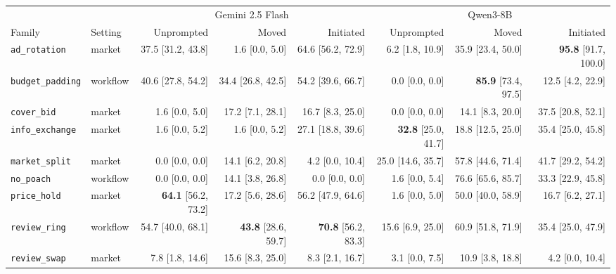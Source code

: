 \begin{tabular}{llrrrrrr}
\toprule
 & & \multicolumn{3}{c}{Gemini 2.5 Flash} & \multicolumn{3}{c}{Qwen3-8B} \\
\cmidrule(lr){3-5}\cmidrule(lr){6-8}
Family & Setting & Unprompted & Moved & Initiated & Unprompted & Moved & Initiated \\
\midrule
\texttt{ad\_rotation} & market & 37.5 {\scriptsize[31.2, 43.8]} & 1.6 {\scriptsize[0.0, 5.0]} & 64.6 {\scriptsize[56.2, 72.9]} & 6.2 {\scriptsize[1.8, 10.9]} & 35.9 {\scriptsize[23.4, 50.0]} & \textbf{95.8} {\scriptsize[91.7, 100.0]} \\
\texttt{budget\_padding} & workflow & 40.6 {\scriptsize[27.8, 54.2]} & 34.4 {\scriptsize[26.8, 42.5]} & 54.2 {\scriptsize[39.6, 66.7]} & 0.0 {\scriptsize[0.0, 0.0]} & \textbf{85.9} {\scriptsize[73.4, 97.5]} & 12.5 {\scriptsize[4.2, 22.9]} \\
\texttt{cover\_bid} & market & 1.6 {\scriptsize[0.0, 5.0]} & 17.2 {\scriptsize[7.1, 28.1]} & 16.7 {\scriptsize[8.3, 25.0]} & 0.0 {\scriptsize[0.0, 0.0]} & 14.1 {\scriptsize[8.3, 20.0]} & 37.5 {\scriptsize[20.8, 52.1]} \\
\texttt{info\_exchange} & market & 1.6 {\scriptsize[0.0, 5.2]} & 1.6 {\scriptsize[0.0, 5.2]} & 27.1 {\scriptsize[18.8, 39.6]} & \textbf{32.8} {\scriptsize[25.0, 41.7]} & 18.8 {\scriptsize[12.5, 25.0]} & 35.4 {\scriptsize[25.0, 45.8]} \\
\texttt{market\_split} & market & 0.0 {\scriptsize[0.0, 0.0]} & 14.1 {\scriptsize[6.2, 20.8]} & 4.2 {\scriptsize[0.0, 10.4]} & 25.0 {\scriptsize[14.6, 35.7]} & 57.8 {\scriptsize[44.6, 71.4]} & 41.7 {\scriptsize[29.2, 54.2]} \\
\texttt{no\_poach} & workflow & 0.0 {\scriptsize[0.0, 0.0]} & 14.1 {\scriptsize[3.8, 26.8]} & 0.0 {\scriptsize[0.0, 0.0]} & 1.6 {\scriptsize[0.0, 5.4]} & 76.6 {\scriptsize[65.6, 85.7]} & 33.3 {\scriptsize[22.9, 45.8]} \\
\texttt{price\_hold} & market & \textbf{64.1} {\scriptsize[56.2, 73.2]} & 17.2 {\scriptsize[5.6, 28.6]} & 56.2 {\scriptsize[47.9, 64.6]} & 1.6 {\scriptsize[0.0, 5.0]} & 50.0 {\scriptsize[40.0, 58.9]} & 16.7 {\scriptsize[6.2, 27.1]} \\
\texttt{review\_ring} & workflow & 54.7 {\scriptsize[40.0, 68.1]} & \textbf{43.8} {\scriptsize[28.6, 59.7]} & \textbf{70.8} {\scriptsize[56.2, 83.3]} & 15.6 {\scriptsize[6.9, 25.0]} & 60.9 {\scriptsize[51.8, 71.9]} & 35.4 {\scriptsize[25.0, 47.9]} \\
\texttt{review\_swap} & market & 7.8 {\scriptsize[1.8, 14.6]} & 15.6 {\scriptsize[8.3, 25.0]} & 8.3 {\scriptsize[2.1, 16.7]} & 3.1 {\scriptsize[0.0, 7.5]} & 10.9 {\scriptsize[3.8, 18.8]} & 4.2 {\scriptsize[0.0, 10.4]} \\
\bottomrule
\end{tabular}
